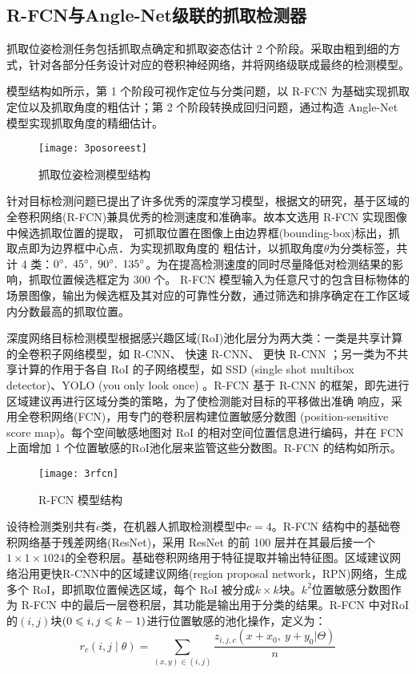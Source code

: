 \subsection{R-FCN与Angle-Net级联的抓取检测器}

抓取位姿检测任务包括抓取点确定和抓取姿态估计 2 个阶段。采取由粗到细的方式，针对各部分任务设计对应的卷积神经网络，并将网络级联成最终的检测模型。

模型结构如所示，第 1 个阶段可视作定位与分类问题，以 R-FCN 为基础实现抓取定位以及抓取角度的粗估计；第 2 个阶段转换成回归问题，通过构造 Angle-Net 模型实现抓取角度的精细估计。

\begin{figure}[!htbp]
	\centering
	\texttt{[image: 3posoreest]}
	\caption{抓取位姿检测模型结构}
     \label{figpoe}
\end{figure}

针对目标检测问题已提出了许多优秀的深度学习模型，根据文的研究，基于区域的全卷积网络(R-FCN)兼具优秀的检测速度和准确率。故本文选用 R-FCN 实现图像中候选抓取位置的提取， 可抓取位置在图像上由边界框(bounding-box)标出，抓取点即为边界框中心点．为实现抓取角度的 粗估计，以抓取角度$\theta$为分类标签，共计 4 类：$0\degree,\ 45\degree,\ 90\degree,\ 135\degree$。为在提高检测速度的同时尽量降低对检测结果的影响，抓取位置候选框定为 300 个。 R-FCN 模型输入为任意尺寸的包含目标物体的场景图像，输出为候选框及其对应的可靠性分数，通过筛选和排序确定在工作区域内分数最高的抓取位置。

深度网络目标检测模型根据感兴趣区域(RoI)池化层分为两大类：一类是共享计算的全卷积子网络模型，如 R-CNN、 快速 R-CNN、 更快 R-CNN ；另一类为不共享计算的作用于各自 RoI 的子网络模型，如 SSD (single shot multibox detector)、YOLO (you only look once) 。R-FCN 基于 R-CNN 的框架，即先进行区域建议再进行区域分类的策略，为了使检测能对目标的平移做出准确 响应，采用全卷积网络(FCN)，用专门的卷积层构建位置敏感分数图 (position-sensitive score map)。每个空间敏感地图对 RoI 的相对空间位置信息进行编码，并在 FCN 上面增加 1 个位置敏感的RoI池化层来监管这些分数图。R-FCN 的结构如所示。

\begin{figure}[!htbp]
	\centering
	\texttt{[image: 3rfcn]}
	\caption{R-FCN 模型结构}
     \label{figrfcn}
\end{figure}

设待检测类别共有$c$类，在机器人抓取检测模型中$c = 4$。R-FCN 结构中的基础卷积网络基于残差网络(ResNet)，采用 ResNet 的前 100 层并在其最后接一个$1\times1\times1024$的全卷积层。基础卷积网络用于特征提取并输出特征图。区域建议网络沿用更快R-CNN中的区域建议网络(region proposal network，RPN)网络，生成多个 RoI，即抓取位置候选区域，每个 RoI 被分成$k\times k$块。$k^2$位置敏感分数图作为 R-FCN 中的最后一层卷积层，其功能是输出用于分类的结果。R-FCN 中对RoI 的$(i, j)$块$(0\leqslant i, j\leqslant k-1)$进行位置敏感的池化操作，定义为：
\begin{equation}
r_c(i,j\mid\theta)=\sum_{(x,y)\in(i,j)}\frac{z_{i,j,c}(x+x_0,\ y+y_0|\Theta)}{n}
\label{eqrcijt}
\end{equation}

